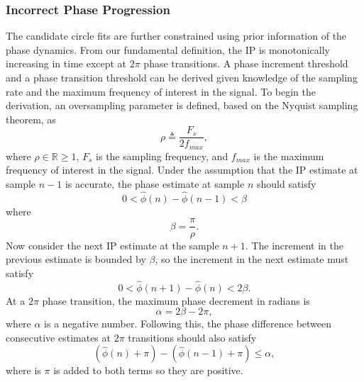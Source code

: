 \documentclass[11pt,draftcls,onecolumn]{IEEEtran}
\begin{document}
\subsubsection{Incorrect Phase Progression}
The candidate circle fits are further constrained using prior information of the phase dynamics. From our fundamental definition, the IP is monotonically increasing in time except at $2\pi$ phase transitions. A phase increment threshold and a phase transition threshold can be derived given knowledge of the sampling rate and the maximum frequency of interest in the signal. To begin the derivation, an oversampling parameter is defined, based on the Nyquist sampling theorem, as
\begin{equation}
	\rho\triangleq\frac{F_s}{2f_{max}},
\end{equation}
where $\rho \in \mathbb{R} \ge 1$, $F_s$ is the sampling frequency, and $f_{max}$ is the maximum frequency of interest in the signal. Under the assumption that the IP estimate at sample $n-1$ is accurate, the phase estimate at sample $n$ should satisfy
\begin{equation}
	0 < \hat\phi(n)-\hat\phi(n-1) < \beta
\end{equation}
where 
\begin{equation}
	\beta = \frac{\pi}{\rho}.
\end{equation}
Now consider the next IP estimate at the sample $n+1$. The increment in the previous estimate is bounded by $\beta$, so the increment in the next estimate must satisfy
\begin{equation}\label{eq:Prior1}
	0 < \hat\phi(n+1)-\hat\phi(n) < 2\beta.
\end{equation} 
At a $2\pi$ phase transition, the maximum phase decrement in radians is
\begin{equation}
	\alpha=2\beta-2\pi,
\end{equation}
where $\alpha$ is a negative number. Following this, the phase difference between consecutive estimates at $2\pi$ transitions should also satisfy
\begin{equation}\label{eq:Prior2}
(\hat{\phi} \left( n \right)+\pi) - (\hat{\phi} \left( n-1\right)+\pi) \le \alpha, 
\end{equation}
where is $\pi$ is added to both terms so they are positive.
\end{document}
